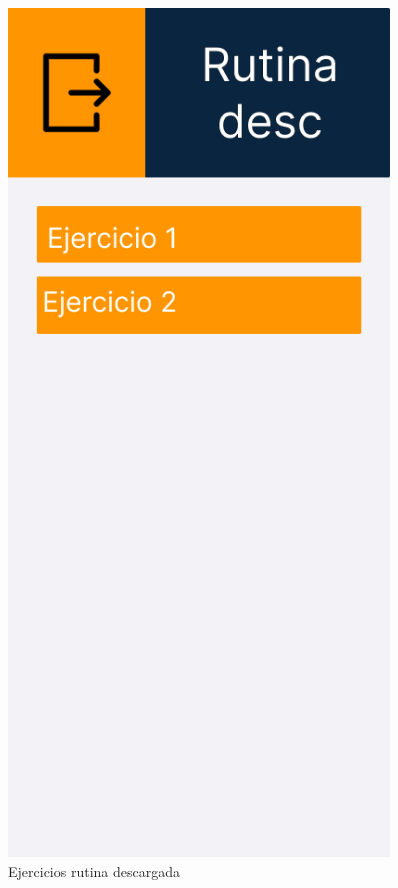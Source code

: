 \begin{figure}[H]
   \centering
   \begin{minipage}{0.45\textwidth}
      \centering
      \includegraphics[width=0.9\textwidth]{fotos/Frame 52.png}
      \caption{Ejercicios rutina descargada}

\end{minipage}
\end{figure}
